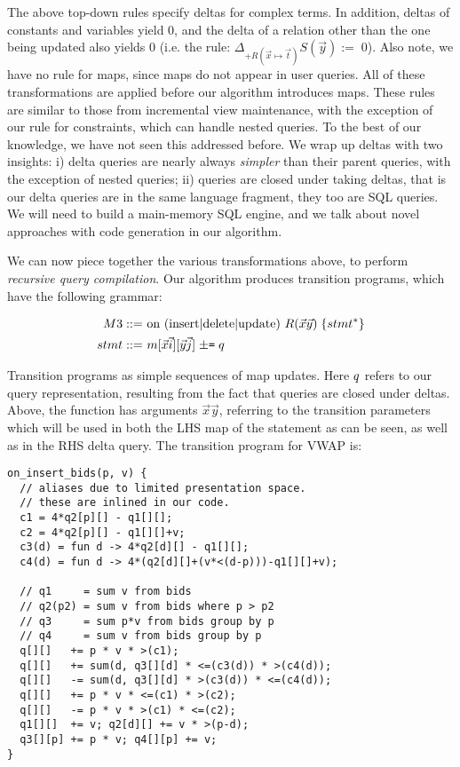 The above top-down rules specify deltas for complex terms. In addition, deltas
of constants and variables yield 0, and the delta of a relation other than the
one being updated also yields 0 (i.e. the rule: $\Delta_{+R(\vec{x} \mapsto
\vec{t})} S(\vec{y}) := \; 0$). Also note, we have no rule for maps, since maps
do not appear in user queries. All of these transformations are applied before
our algorithm introduces maps. These rules are similar to those from
incremental view maintenance, with the exception of our rule for constraints,
which can handle nested queries. To the best of our knowledge, we have not seen
this addressed before. We wrap up deltas with two insights: i) delta queries are
nearly always \textit{simpler} than their parent queries, with the exception of
nested queries; ii) queries are closed under taking deltas, that is our delta
queries are in the same language fragment, they too are SQL queries.
We will need to build a main-memory SQL engine, and we talk about novel
approaches with code generation in our algorithm.

We can now piece together the various transformations above, to perform
\textit{recursive query compilation}. Our algorithm produces transition
programs, which have the following grammar:

\vspace{-3mm}
\begin{align*}
M3    & \; \mbox{::= on (insert$|$delete$|$update) }
           R(\vec{x}\vec{y}) \; \{ stmt^* \}\\
\comment{event & \; \mbox{::= insert $|$ delete}\\}
stmt  & \; \mbox{::= } m[\vec{x}\vec{i}][\vec{y}\vec{j}] \;
                       \mbox{{\tt $\pm$=}} \; \q\\
\end{align*}

\noindent Transition programs as simple sequences of map updates.
Here $q$ refers to our query representation, resulting from the fact that
queries are closed under deltas. Above, the function has arguments
$\vec{x}\vec{y}$, referring to the transition parameters which will be used in
both the LHS map of the statement as can be seen, as well as in the RHS delta
query.
The transition program for VWAP is:

\begin{verbatim}
on_insert_bids(p, v) {
  // aliases due to limited presentation space.
  // these are inlined in our code.
  c1 = 4*q2[p][] - q1[][];
  c2 = 4*q2[p][] - q1[][]+v;
  c3(d) = fun d -> 4*q2[d][] - q1[][];
  c4(d) = fun d -> 4*(q2[d][]+(v*<(d-p)))-q1[][]+v);

  // q1     = sum v from bids
  // q2(p2) = sum v from bids where p > p2
  // q3     = sum p*v from bids group by p
  // q4     = sum v from bids group by p
  q[][]   += p * v * >(c1);  
  q[][]   += sum(d, q3[][d] * <=(c3(d)) * >(c4(d));
  q[][]   -= sum(d, q3[][d] * >(c3(d)) * <=(c4(d));
  q[][]   += p * v * <=(c1) * >(c2);
  q[][]   -= p * v * >(c1) * <=(c2);
  q1[][]  += v; q2[d][] += v * >(p-d); 
  q3[][p] += p * v; q4[][p] += v;
}
\end{verbatim}

